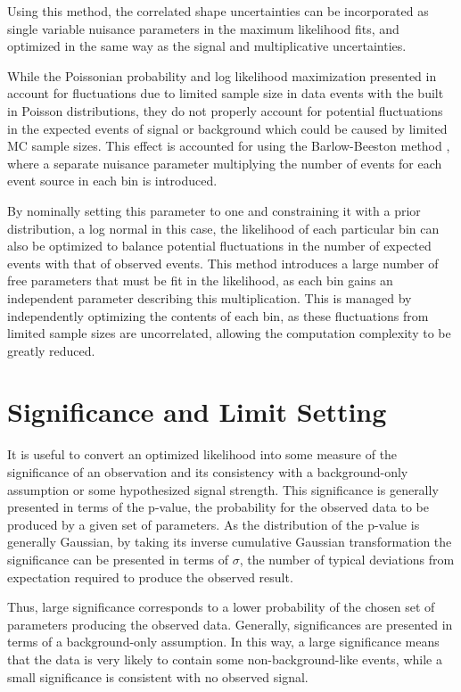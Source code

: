 Using this method, the correlated shape uncertainties can be incorporated as single variable nuisance parameters in the maximum likelihood fits, and optimized in the same way as the signal and multiplicative uncertainties.

While the Poissonian probability and log likelihood maximization presented in  account for fluctuations due to limited sample size in data events with the built in Poisson distributions, they do not properly account for potential fluctuations in the expected events of signal or background which could be caused by limited MC sample sizes.
This effect is accounted for using the Barlow-Beeston method \cite{BarlowBeeston}, where a separate nuisance parameter multiplying the number of events for each event source in each bin is introduced.

By nominally setting this parameter to one and constraining it with a prior distribution, a log normal in this case, the likelihood of each particular bin can also be optimized to balance potential fluctuations in the number of expected events with that of observed events.
This method introduces a large number of free parameters that must be fit in the likelihood, as each bin gains an independent parameter describing this multiplication.
This is managed by independently optimizing the contents of each bin, as these fluctuations from limited sample sizes are uncorrelated, allowing the computation complexity to be greatly reduced.

\section{Significance and Limit Setting}
It is useful to convert an optimized likelihood into some measure of the significance of an observation and its consistency with a background-only assumption or some hypothesized signal strength. 
This significance is generally presented in terms of the p-value, the probability for the observed data to be produced by a given set of parameters. 
As the distribution of the p-value is generally Gaussian, by taking its inverse cumulative Gaussian transformation the significance can be presented in terms of $\sigma$, the number of typical deviations from expectation required to produce the observed result.

Thus, large significance corresponds to a lower probability of the chosen set of parameters producing the observed data.
Generally, significances are presented in terms of a background-only assumption. 
In this way, a large significance means that the data is very likely to contain some non-background-like events, while a small significance is consistent with no observed signal.

